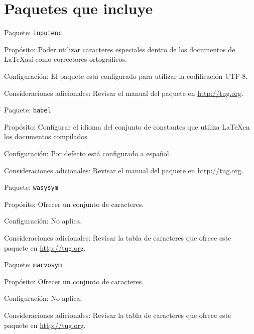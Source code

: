 

\section{Paquetes que incluye}

\begin{Cdescription}
	\item[Paquete:] {\tt inputenc}
	\item[Propósito:] Poder utilizar caracteres especiales dentro de los documentos de \LaTeX así como correctores ortográficos.
	\item[Configuración:] El paquete está configurado para utilizar la codificación UTF-8.
	\item[Consideraciones adicionales:] Revisar el manual del paquete en \url{http://tug.org}.
\end{Cdescription}

\begin{Cdescription}
	\item[Paquete:] {\tt babel}
	\item[Propósito:] Configurar el idioma del conjunto de constantes que utiliza \LaTeX en los documentos compilados 
	\item[Configuración:] Por defecto está configurado a español.
	\item[Consideraciones adicionales:] Revisar el manual del paquete en \url{http://tug.org}.
\end{Cdescription}

\begin{Cdescription}
	\item[Paquete:] {\tt wasysym}
	\item[Propósito:] Ofrecer un conjunto de caracteres.
	\item[Configuración:] No aplica.
	\item[Consideraciones adicionales:] Revisar la tabla de caracteres que ofrece este paquete en \url{http://tug.org}.
\end{Cdescription}

\begin{Cdescription}
	\item[Paquete:] {\tt marvosym}
	\item[Propósito:] Ofrecer un conjunto de caracteres.
	\item[Configuración:] No aplica.
	\item[Consideraciones adicionales:] Revisar la tabla de caracteres que ofrece este paquete en \url{http://tug.org}.
\end{Cdescription}

